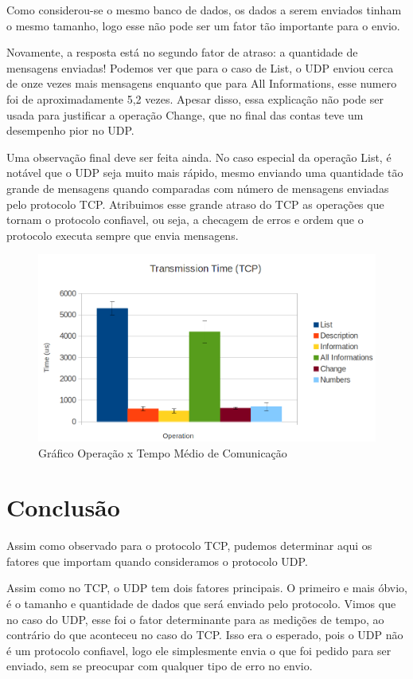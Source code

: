 \documentclass[10pt,a4paper]{report}
\begin{document}
	Como considerou-se o mesmo banco de dados, os dados a serem enviados tinham o mesmo tamanho, logo esse não pode ser um fator tão importante para o envio.
	
	Novamente, a resposta está no segundo fator de atraso: a quantidade de mensagens enviadas! Podemos ver que para o caso de List, o UDP enviou cerca de onze vezes mais mensagens enquanto que para All Informations, esse numero foi de aproximadamente 5,2 vezes. Apesar disso, essa explicação não pode ser usada para justificar a operação Change, que no final das contas teve um desempenho pior no UDP.

	Uma observação final deve ser feita ainda. No caso especial da operação List, é notável que o UDP seja muito mais rápido, mesmo enviando uma quantidade tão grande de mensagens quando comparadas com número de mensagens enviadas pelo protocolo TCP. Atribuimos esse grande atraso do TCP as operações que tornam o protocolo confiavel, ou seja, a checagem de erros e ordem que o protocolo executa sempre que envia mensagens.
	
\begin{figure}[h!]
\includegraphics[width=\textwidth]{Imagens/tcp.png}
\caption{Gráfico Operação x Tempo Médio de Comunicação}
\end{figure}
	
\chapter{Conclusão}
Assim como observado para o protocolo TCP, pudemos determinar aqui os fatores que importam quando consideramos o protocolo UDP.

	Assim como no TCP, o UDP tem dois fatores principais. O primeiro e mais óbvio, é o tamanho e quantidade de dados que será enviado pelo protocolo. Vimos que no caso do UDP, esse foi o fator determinante para as medições de tempo, ao contrário do que aconteceu no caso do TCP. Isso era o esperado, pois o UDP não é um protocolo confiavel, logo ele simplesmente envia o que foi pedido para ser enviado, sem se preocupar com qualquer tipo de erro no envio.
\end{document}
